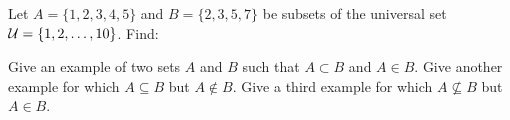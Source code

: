 \begin{squestions}
\begin{answer}
  \end{answer}




\question Let $A = \{1, 2, 3, 4, 5\}$ and $B = \{2, 3, 5, 7\}$ be subsets of the universal set $\mathcal U = \{1, 2, \ldots, 10\}$.  Find:

  \begin{answer}
  \end{answer}




\question Give an example of two sets $A$ and $B$ such that $A \subset B$ and $A \in B$.  Give another example for which $A \subseteq B$ but $A \notin B$.  Give a third example for which $A \not\subseteq B$ but $A \in B$.


\end{squestions}
